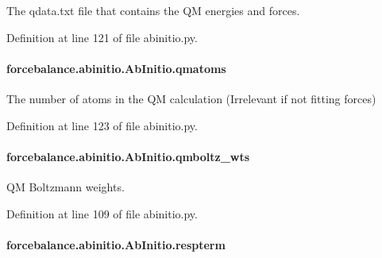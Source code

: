The qdata.\-txt file that contains the Q\-M energies and forces. 



Definition at line 121 of file abinitio.\-py.

\hypertarget{classforcebalance_1_1abinitio_1_1AbInitio_af0760b8d33ce9dd044ccbe68fba7a1be}{
\paragraph[{qmatoms}]{\setlength{\rightskip}{0pt plus 5cm}forcebalance.\-abinitio.\-Ab\-Initio.\-qmatoms\hspace{0.3cm}{\ttfamily [inherited]}}}\label{classforcebalance_1_1abinitio_1_1AbInitio_af0760b8d33ce9dd044ccbe68fba7a1be}


The number of atoms in the Q\-M calculation (Irrelevant if not fitting forces) 



Definition at line 123 of file abinitio.\-py.

\hypertarget{classforcebalance_1_1abinitio_1_1AbInitio_a06ec6b12d81791ca94f599f41e56335a}{
\paragraph[{qmboltz\-\_\-wts}]{\setlength{\rightskip}{0pt plus 5cm}forcebalance.\-abinitio.\-Ab\-Initio.\-qmboltz\-\_\-wts\hspace{0.3cm}{\ttfamily [inherited]}}}\label{classforcebalance_1_1abinitio_1_1AbInitio_a06ec6b12d81791ca94f599f41e56335a}


Q\-M Boltzmann weights. 



Definition at line 109 of file abinitio.\-py.

\hypertarget{classforcebalance_1_1abinitio_1_1AbInitio_a689e3849518b33539442a473a41ed32d}{
\paragraph[{respterm}]{\setlength{\rightskip}{0pt plus 5cm}forcebalance.\-abinitio.\-Ab\-Initio.\-respterm\hspace{0.3cm}{\ttfamily [inherited]}}}\label{classforcebalance_1_1abinitio_1_1AbInitio_a689e3849518b33539442a473a41ed32d}



